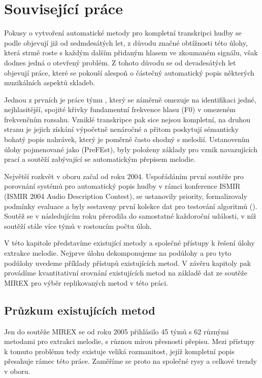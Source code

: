 \chapter{Související práce}\label{cha:souvisejici}

Pokusy o vytvoření automatické metody pro kompletní transkripci hudby se podle \cite{Poliner2007} objevují již od sedmdesátých let, z důvodu značné obtížnosti této úlohy, která strmě roste s každým dalším přidaným hlasem ve zkoumaném signálu, však dodnes jedná o otevřený problém. Z tohoto důvodu se od devadesátých let objevují práce, které se pokouší alespoň o částečný automatický popis některých muzikálních aspektů skladeb.

Jednou z prvních je práce týmu \cite{Goto1999}, který se záměrně omezuje na identifikaci jedné, nejhlasitější, spojité křivky fundamentní frekvence hlasu (F0) v omezeném frekvenčním rozsahu. Vzniklé transkripce pak sice nejsou kompletní, na druhou stranu je jejich získání výpočetně nenáročné a přitom poskytují sémanticky bohatý popis nahrávek, který je poměrně často shodný s melodií. Ustanovením úlohy pojmenované jako  (PreFEst), byly položeny základy pro vznik navazujících prací a soutěží zabývající se automatickým přepisem melodie.

Největší rozkvět v oboru začal od roku 2004. Uspořádáním první soutěže pro porovnání systémů pro automatický popis hudby v rámci konference ISMIR (ISMIR 2004 Audio Description Contest), se ustanovily priority, formalizovaly podmínky evaluace a byly sestaveny první kolekce dat pro testování algoritmů (\cite{Downie2010}). Soutěž se v následujícím roku přerodila do samostatné každoroční události, v níž soutěží stále více týmů v rostoucím počtu úloh. 

V této kapitole představíme existující metody a společné přístupy k řešení úlohy extrakce melodie. Nejprve úlohu dekomponujeme na podúlohy a pro tyto podúlohy uvedeme příklady přístupů existujících metod. V závěru kapitoly pak provádíme kvantitativní srovnání existujících metod na základě dat ze soutěže MIREX pro výběr replikovaných metod v této práci.

\section{Průzkum existujících metod}

Jen do soutěže MIREX se od roku 2005 přihlásilo 45 týmů s 62 různými metodami pro extrakci melodie, s různou mírou přesnosti přepisu. Mezi přístupy k tomuto problému tedy existuje veliká rozmanitost, jejíž kompletní popis přesahuje rámec této práce. Zaměříme se proto na společné rysy a celkové trendy v oboru. 

